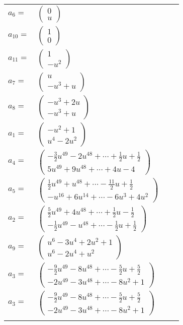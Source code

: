 \documentclass[1p]{elsarticle_modified}
\theoremstyle{definition}
\begin{document}
\begin{tabular}{m{7pt} m{180pt} m{7pt} m{180pt} }
\flushright $a_{6}=$&$\begin{pmatrix}0\\u\end{pmatrix}$ \\
\flushright $a_{10}=$&$\begin{pmatrix}1\\0\end{pmatrix}$ \\
\flushright $a_{11}=$&$\begin{pmatrix}1\\- u^2\end{pmatrix}$ \\
\flushright $a_{7}=$&$\begin{pmatrix}u\\- u^3+u\end{pmatrix}$ \\
\flushright $a_{8}=$&$\begin{pmatrix}- u^3+2 u\\- u^3+u\end{pmatrix}$ \\
\flushright $a_{1}=$&$\begin{pmatrix}- u^2+1\\u^4-2 u^2\end{pmatrix}$ \\
\flushright $a_{4}=$&$\begin{pmatrix}-\frac{3}{2} u^{49}-2 u^{48}+\cdots+\frac{1}{2} u+\frac{1}{2}\\5 u^{49}+9 u^{48}+\cdots+4 u-4\end{pmatrix}$ \\
\flushright $a_{5}=$&$\begin{pmatrix}\frac{1}{2} u^{49}+u^{48}+\cdots-\frac{11}{2} u+\frac{1}{2}\\- u^{16}+6 u^{14}+\cdots-6 u^3+4 u^2\end{pmatrix}$ \\
\flushright $a_{2}=$&$\begin{pmatrix}\frac{5}{2} u^{49}+4 u^{48}+\cdots+\frac{1}{2} u-\frac{1}{2}\\-\frac{1}{2} u^{49}- u^{48}+\cdots-\frac{1}{2} u+\frac{1}{2}\end{pmatrix}$ \\
\flushright $a_{9}=$&$\begin{pmatrix}u^6-3 u^4+2 u^2+1\\u^6-2 u^4+u^2\end{pmatrix}$ \\
\flushright $a_{3}=$&$\begin{pmatrix}-\frac{9}{2} u^{49}-8 u^{48}+\cdots-\frac{5}{2} u+\frac{5}{2}\\-2 u^{49}-3 u^{48}+\cdots-8 u^2+1\end{pmatrix}$\\ \flushright $a_{3}=$&$\begin{pmatrix}-\frac{9}{2} u^{49}-8 u^{48}+\cdots-\frac{5}{2} u+\frac{5}{2}\\-2 u^{49}-3 u^{48}+\cdots-8 u^2+1\end{pmatrix}$\\&\end{tabular}
\end{document}
